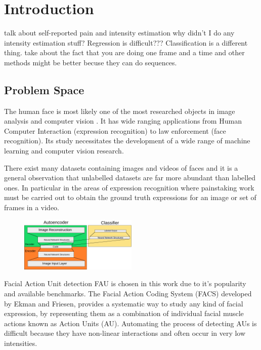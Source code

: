 \chapter{Introduction}
talk about self-reported pain and intensity estimation
why didn't I do any intensity estimation stuff?
Regression is difficult??? Classification is a different thing.
take about the fact that you are doing one frame and a time and
other methods might be better becuse they can do sequences.
\section{Problem Space}
The human face is most likely one of the most researched objects in image analysis
and computer vision \cite{S.ZafeiriouA.PapaioannouI.KotsiaM.A.Nicolaou}.
It has wide ranging applications from Human
Computer Interaction (expression recognition) to law enforcement (face recognition).
Its study necessitates the development of a wide range of machine
learning and computer vision research.

There exist many datasets containing images and videos of faces and it is a general
observation that unlabelled datasets are far more abundant than labelled ones.
In particular in the areas of expression recognition where painstaking work
must be carried out to obtain the ground truth expressions for an image or set of
frames in a video.

\begin{figure}
 \centering
 \includegraphics[width=0.5\textwidth]{illustrations/network_01.pdf}
\end{figure}

Facial Action Unit detection FAU \cite{Corneanu2016} is chosen in this work due
to it's popularity and available benchmarks.
The Facial Action Coding System (FACS) developed by Ekman and Friesen,
provides a systematic way to study any kind of facial expression,
by representing them as a combination of individual facial muscle actions
known as Action Units (AU). Automating the process of detecting AUs is difficult
because they have non-linear interactions and often occur in very low intensities.

